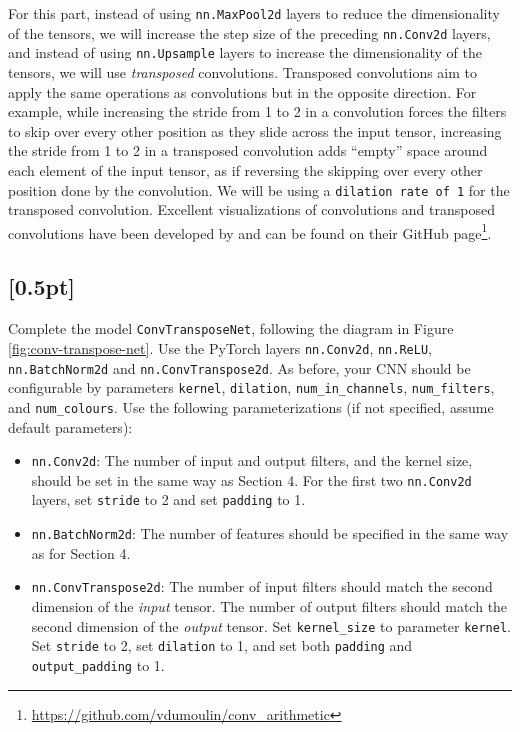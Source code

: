 For this part, instead of using \texttt{nn.MaxPool2d} layers to reduce the dimensionality of the tensors, we will increase the step size of the preceding \texttt{nn.Conv2d} layers, and instead of using \texttt{nn.Upsample} layers to increase the dimensionality of the tensors, we will use \textit{transposed} convolutions. 
Transposed convolutions aim to apply the same operations as convolutions but in the opposite direction. 
For example, while increasing the stride from 1 to 2 in a convolution forces the filters to skip over every other position as they slide across the input tensor, increasing the stride from 1 to 2 in a transposed convolution adds ``empty'' space around each element of the input tensor, as if reversing the skipping over every other position done by the convolution. 
We will be using a \texttt{dilation rate of 1} for the transposed convolution. 
Excellent visualizations of convolutions and transposed convolutions have been developed by \cite{dumoulin2018guide} and can be found on their GitHub page\footnote{\url{https://github.com/vdumoulin/conv\_arithmetic}}.

\subsection{{\color{blue}[0.5pt] \LI}}

Complete the model \texttt{ConvTransposeNet}, following the diagram in Figure \ref{fig:conv-transpose-net}. Use the PyTorch layers \texttt{nn.Conv2d}, \texttt{nn.ReLU}, \texttt{nn.BatchNorm2d} and \texttt{nn.ConvTranspose2d}. As before, your CNN should be configurable by parameters \texttt{kernel}, \texttt{dilation}, \texttt{num\_in\_channels}, \texttt{num\_filters}, and \texttt{num\_colours}. Use the following parameterizations (if not specified, assume default parameters):

\begin{itemize}
  \item \texttt{nn.Conv2d}: The number of input and output filters, and the kernel size, should be set in the same way as Section 4. For the first two \texttt{nn.Conv2d} layers, set \texttt{stride} to 2 and set \texttt{padding} to 1.
  \item \texttt{nn.BatchNorm2d}: The number of features should be specified in the same way as for Section 4.
  \item \texttt{nn.ConvTranspose2d}: The number of input filters should match the second dimension of the \textit{input} tensor. The number of output filters should match the second dimension of the \textit{output} tensor. Set \texttt{kernel\_size} to parameter \texttt{kernel}. Set \texttt{stride} to 2, set \texttt{dilation} to 1, and set both \texttt{padding} and \texttt{output\_padding} to 1.
\end{itemize}

